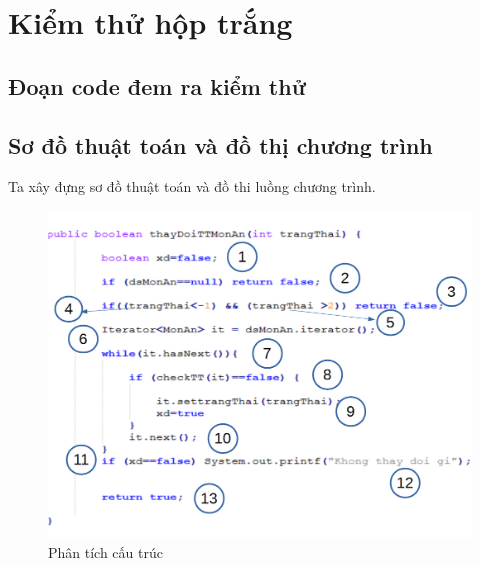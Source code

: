 \documentclass[a4paper,12pt]{report}
\begin{document}
\section{Kiểm thử hộp trắng}
\subsection{Đoạn code đem ra kiểm thử }

\subsection{Sơ đồ thuật toán và đồ thị chương trình} 
Ta xây đựng sơ đồ thuật toán và đồ thi luồng chương trình.
\begin{figure}[H]
		\centering
		\includegraphics[scale=0.5]{KTHopTrang.png}
		\caption{Phân tích cấu trúc}
\end{figure}
\end{document}

